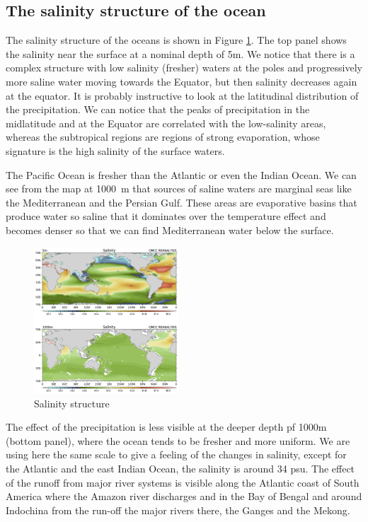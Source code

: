 \subsection{The salinity structure of the ocean }
The salinity structure of the oceans is shown in Figure \ref{fig:fig1}.  The top panel shows the salinity near the surface at a nominal depth of
5m. We notice that there is a complex structure with low salinity
(fresher) waters at the poles and progressively more saline water moving towards the Equator, but then salinity decreases again at the equator. It is probably instructive to look at the latitudinal distribution of the precipitation. We can notice that the peaks of precipitation in the midlatitude and at the Equator are correlated with the low-salinity areas, whereas the subtropical regions are regions of strong evaporation, whose signature is the high salinity of the surface waters.

The Pacific Ocean is fresher than the Atlantic or even the Indian Ocean.
We can see from the map at \qty{1000}{m} that sources of saline waters are
marginal seas like the Mediterranean and the Persian Gulf. These areas
are evaporative basins that produce water so saline that it dominates
over the temperature effect and becomes denser so that we can find
Mediterranean water below the surface.
\begin{figure}
	\begin{center}
		\includegraphics[width=0.48\textwidth]{uploads/26image.png}
	\end{center}
	\caption{Salinity structure}
	\label{fig:fig1}
\end{figure}


The effect of the precipitation is less visible at the deeper depth pf
1000m (bottom panel), where the ocean tends to be fresher and more
uniform. We are using here the same scale to give a feeling of the
changes in salinity, except for the Atlantic and the east Indian Ocean,
the salinity is around 34 psu.
The effect of the runoff from major river systems is visible along the
Atlantic coast of South America where the Amazon river discharges and in the Bay of Bengal and around Indochina from the run-off the major rivers there, the Ganges and the Mekong.



